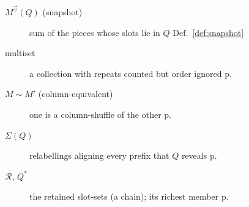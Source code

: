 \documentclass{article}
\begin{document}
\begin{description}
\item[$M^{\vec v}(Q)$ (snapshot)] sum of the pieces whose slots lie in $Q$ \dotfill Def.~\ref{def:snapshot}
\item[multiset] a collection with repeats counted but order ignored \dotfill p.~\pageref{def:multiset}
\item[$M\sim M'$ (column-equivalent)] one is a column-shuffle of the other \dotfill p.~\pageref{def:colequiv}
\item[$\Sigma(Q)$] relabellings aligning every prefix that $Q$ reveals \dotfill p.~\pageref{def:sigma}
\item[$\mathcal R$, $Q^\ast$] the retained slot-sets (a chain); its richest member \dotfill p.~\pageref{def:retained}
\end{description}
\end{document}
